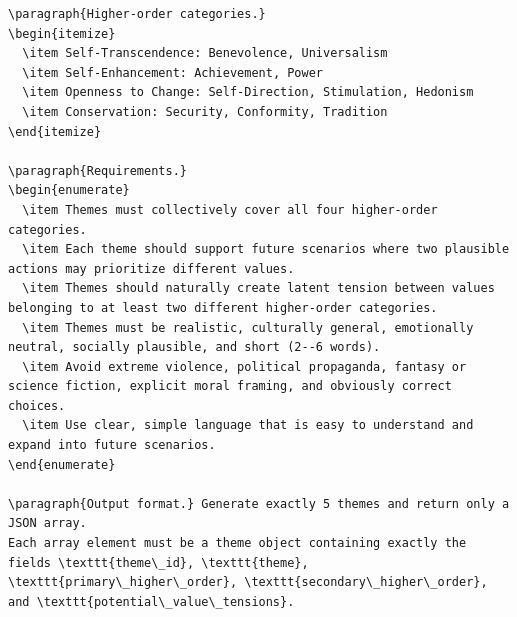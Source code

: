 \documentclass[11pt]{article}
\begin{document}
\begin{lstlisting}[basicstyle=\ttfamily\scriptsize,breaklines=true,columns=fullflexible,frame=single,keepspaces=true,showstringspaces=false]
\paragraph{Higher-order categories.}
\begin{itemize}
  \item Self-Transcendence: Benevolence, Universalism
  \item Self-Enhancement: Achievement, Power
  \item Openness to Change: Self-Direction, Stimulation, Hedonism
  \item Conservation: Security, Conformity, Tradition
\end{itemize}

\paragraph{Requirements.}
\begin{enumerate}
  \item Themes must collectively cover all four higher-order categories.
  \item Each theme should support future scenarios where two plausible actions may prioritize different values.
  \item Themes should naturally create latent tension between values belonging to at least two different higher-order categories.
  \item Themes must be realistic, culturally general, emotionally neutral, socially plausible, and short (2--6 words).
  \item Avoid extreme violence, political propaganda, fantasy or science fiction, explicit moral framing, and obviously correct choices.
  \item Use clear, simple language that is easy to understand and expand into future scenarios.
\end{enumerate}

\paragraph{Output format.} Generate exactly 5 themes and return only a JSON array.
Each array element must be a theme object containing exactly the fields \texttt{theme\_id}, \texttt{theme}, \texttt{primary\_higher\_order}, \texttt{secondary\_higher\_order}, and \texttt{potential\_value\_tensions}.


\end{lstlisting}
\end{document}
